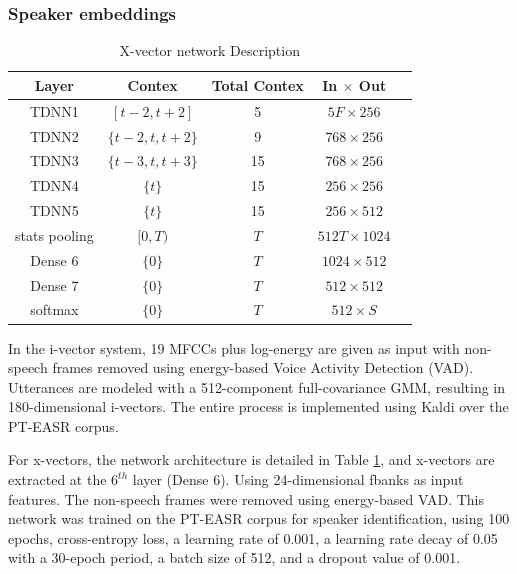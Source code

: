 \subsubsection{Speaker embeddings}
\begin{table}[h]
  \centering
  \begin{tabular}{ccccc}
  \hline
  Layer & Contex & Total Contex & In $\times$ Out \\
  \hline
  TDNN1 & $[t-2, t+2]$ & 5 & $5F \times 256$ & \\
  TDNN2 & $\{t-2, t, t+2\}$ & 9 & $768 \times 256$ & \\
  TDNN3 & $\{t-3, t, t+3\}$ & 15 & $768 \times 256$ & \\
  TDNN4 & $\{t\}$ & 15 & $256 \times 256$ & \\
  TDNN5 & $\{t\}$ & 15 & $256 \times 512$ & \\
  stats pooling & $[0, T)$ & $T$ & $512T \times 1024$ & \\
  Dense 6 & $\{0\}$ & $T$ & $1024 \times 512$ & \\
  Dense 7 & $\{0\}$ & $T$ & $512 \times 512$ & \\
  softmax & $\{0\}$ & $T$ & $512 \times S$ & \\
  \hline
  \end{tabular}
  \caption{X-vector network Description}
  \label{tab:xvect_description}
  \end{table}
  In the i-vector system, 19 MFCCs plus log-energy are given as input  with non-speech frames removed using energy-based Voice Activity Detection (VAD). Utterances are modeled with a 512-component full-covariance GMM, resulting in 180-dimensional i-vectors. The entire process is implemented using Kaldi \cite{kaldi} over the PT-EASR corpus.

  For x-vectors, the network architecture is detailed in Table \ref{tab:xvect_description}, and x-vectors are extracted at the $6^{th}$ layer (Dense 6). Using 24-dimensional fbanks as input features. The non-speech frames were removed using energy-based VAD. This network was trained on the PT-EASR corpus for speaker identification, using 100 epochs, cross-entropy loss, a learning rate of 0.001, a learning rate decay of 0.05 with a 30-epoch period, a batch size of 512, and a dropout value of 0.001.

